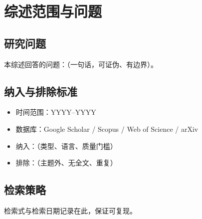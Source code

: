 \section{综述范围与问题}
\label{sec:scope}

\subsection{研究问题}
本综述回答的问题：（一句话，可证伪、有边界）。

\subsection{纳入与排除标准}
\begin{itemize}
  \item 时间范围：YYYY--YYYY
  \item 数据库：Google Scholar / Scopus / Web of Science / arXiv
  \item 纳入：（类型、语言、质量门槛）
  \item 排除：（主题外、无全文、重复）
\end{itemize}

\subsection{检索策略}
检索式与检索日期记录在此，保证可复现。

